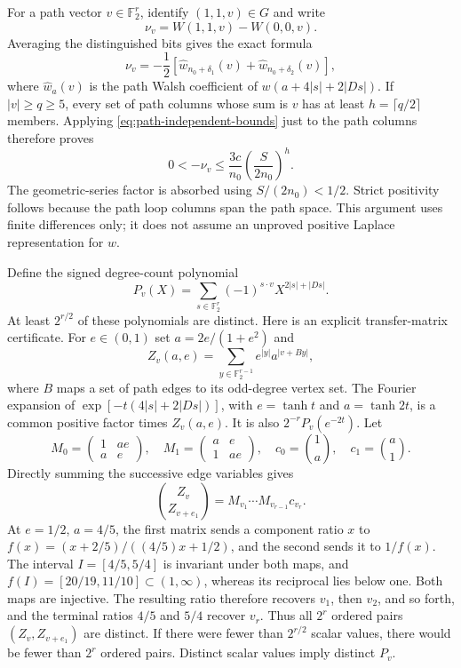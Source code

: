 For a path vector $v\in\mathbb F_2^r$, identify $(1,1,v)\in G$ and
write
\[
 \nu_v=W(1,1,v)-W(0,0,v).
\]
Averaging the distinguished bits gives the exact formula
\begin{equation}\label{eq:path-effective}
 \nu_v=-\frac12\left[\widehat w_{n_0+\delta_1}(v)
                         +\widehat w_{n_0+\delta_2}(v)\right],
\end{equation}
where $\widehat w_a(v)$ is the path Walsh coefficient of
$w(a+4|s|+2|Ds|)$. If $|v|\ge q\ge5$, every set of path columns
whose sum is $v$ has at least $h=\lceil q/2\rceil$ members.
Applying \eqref{eq:path-independent-bounds} just to the path columns
therefore proves
\begin{equation}\label{eq:path-tail}
 0<-\nu_v\le\frac{3c}{n_0}
                  \left(\frac{S}{2n_0}\right)^h.
\end{equation}
The geometric-series factor is absorbed using $S/(2n_0)<1/2$.
Strict positivity follows because the path loop columns span the path
space. This argument uses finite differences only; it does not assume
an unproved positive Laplace representation for $w$.

Define the signed degree-count polynomial
\[
 P_v(X)=\sum_{s\in\mathbb F_2^r}(-1)^{s\cdot v}
                              X^{2|s|+|Ds|}.
\]
At least $2^{r/2}$ of these polynomials are distinct. Here is an
explicit transfer-matrix certificate. For $e\in(0,1)$ set
$a=2e/(1+e^2)$ and
\[
 Z_v(a,e)=\sum_{y\in\mathbb F_2^{r-1}}e^{|y|}a^{|v+By|},
\]
where $B$ maps a set of path edges to its odd-degree vertex set.
The Fourier expansion of $\exp[-t(4|s|+2|Ds|)]$, with
$e=\tanh t$ and $a=\tanh2t$, is a common positive factor times
$Z_v(a,e)$. It is also $2^{-r}P_v(e^{-2t})$.
Let
\[
 M_0=\begin{pmatrix}1&ae\\a&e\end{pmatrix},\quad
 M_1=\begin{pmatrix}a&e\\1&ae\end{pmatrix},\quad
 c_0=\binom1a,\quad c_1=\binom a1.
\]
Directly summing the successive edge variables gives
\[
 \binom{Z_v}{Z_{v+e_1}}=M_{v_1}\cdots M_{v_{r-1}}c_{v_r}.
\]
At $e=1/2$, $a=4/5$, the first matrix sends a component ratio $x$ to
$f(x)=(x+2/5)/((4/5)x+1/2)$, and the second sends it to $1/f(x)$.
The interval $I=[4/5,5/4]$ is invariant under both maps, and
$f(I)=[20/19,11/10]\subset(1,\infty)$, whereas its reciprocal lies
below one. Both maps are injective. The resulting ratio therefore
recovers $v_1$, then $v_2$, and so forth, and the terminal ratios
$4/5$ and $5/4$ recover $v_r$. Thus all $2^r$ ordered pairs
$(Z_v,Z_{v+e_1})$ are distinct. If there were fewer than $2^{r/2}$
scalar values, there would be fewer than $2^r$ ordered pairs.
Distinct scalar values imply distinct $P_v$.

